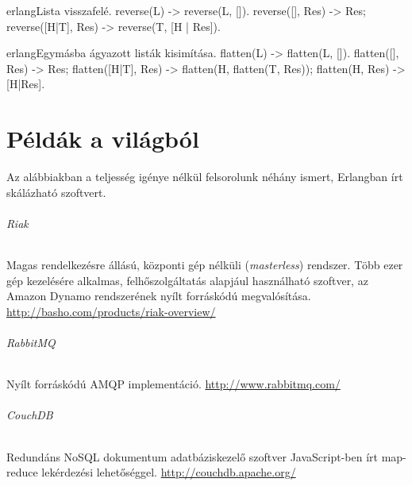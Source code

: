 \documentclass[12pt, a4paper, oneside]{book}
\begin{document}
\begin{code}{erlang}{Lista visszafelé.}
reverse(L) ->
  reverse(L, []).
reverse([], Res) ->
  Res;
reverse([H|T], Res) ->
  reverse(T, [H | Res]).
\end{code}

\newpage
\begin{code}{erlang}{Egymásba ágyazott listák kisimítása.}
flatten(L) -> flatten(L, []).
flatten([], Res) -> Res;
flatten([H|T], Res) ->
  flatten(H, flatten(T, Res));
flatten(H, Res) ->
  [H|Res].
\end{code}

\chapter{Példák a világból}
Az alábbiakban a teljesség igénye nélkül felsorolunk néhány ismert, Erlangban
írt skálázható szoftvert.

\subparagraph{Riak} Magas rendelkezésre állású, központi gép nélküli
(\emph{masterless}) rendszer. Több ezer gép kezelésére alkalmas,
felhőszolgáltatás alapjául használható szoftver, az Amazon Dynamo rendszerének
nyílt forráskódú megvalósítása. \url{http://basho.com/products/riak-overview/}

\subparagraph{RabbitMQ} Nyílt forráskódú AMQP implementáció.
\url{http://www.rabbitmq.com/}

\subparagraph{CouchDB} Redundáns NoSQL dokumentum adatbáziskezelő szoftver
JavaScript-ben írt map-reduce lekérdezési lehetőséggel.
\url{http://couchdb.apache.org/}
\end{document}
